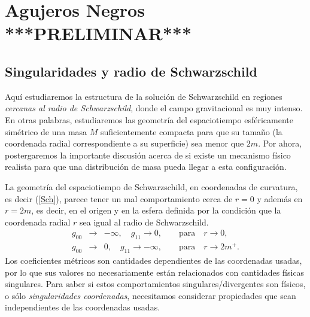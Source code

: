 \chapter{Agujeros Negros ***PRELIMINAR***}


\section{Singularidades y radio de Schwarzschild}

Aquí estudiaremos la estructura de la solución de Schwarzschild en regiones \textit{cercanas al radio de Schwarzschild}, donde el campo gravitacional es muy intenso. En otras palabras, estudiaremos las geometría del espaciotiempo esféricamente simétrico de una masa $M$ suficientemente compacta para que su tamaño (la coordenada radial correspondiente a su superficie) sea menor que $2m$. Por ahora, postergaremos la importante discusión acerca de si existe un mecanismo físico realista para que una distribución de masa pueda llegar a esta configuración.

La geometría del espaciotiempo de Schwarzschild, en coordenadas de
curvatura, es decir (\ref{Sch}), parece tener un mal comportamiento cerca de
$r=0$ y además en $r=2m$, es decir, en el origen y en la esfera definida por
la condición que la coordenada radial $r$ sea igual al radio de Schwarzschild.
\begin{eqnarray}
 g_{00}&\to& -\infty,\quad g_{11}\to 0, \qquad \text{para}\quad r\to 0 ,\\
 g_{00}&\to& 0,\quad g_{11}\to -\infty, \qquad \text{para}\quad r\to 2m^+ .
\end{eqnarray}
Los coeficientes métricos son cantidades dependientes de las coordenadas
usadas, por lo que sus valores no necesariamente están relacionados con
cantidades físicas singulares. Para saber si estos comportamientos
singulares/divergentes son físicos, o sólo \textit{singularidades coordenadas},
necesitamos considerar propiedades que sean independientes de las coordenadas
usadas.

